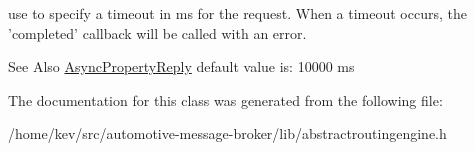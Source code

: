 use to specify a timeout in ms for the request. When a timeout occurs, the 'completed' callback will be called with an error. 

\begin{DoxySeeAlso}{See Also}
\hyperlink{classAsyncPropertyReply}{Async\-Property\-Reply} default value is\-: 10000 ms 
\end{DoxySeeAlso}


The documentation for this class was generated from the following file\-:\begin{DoxyCompactItemize}
\item 
/home/kev/src/automotive-\/message-\/broker/lib/abstractroutingengine.\-h\end{DoxyCompactItemize}
